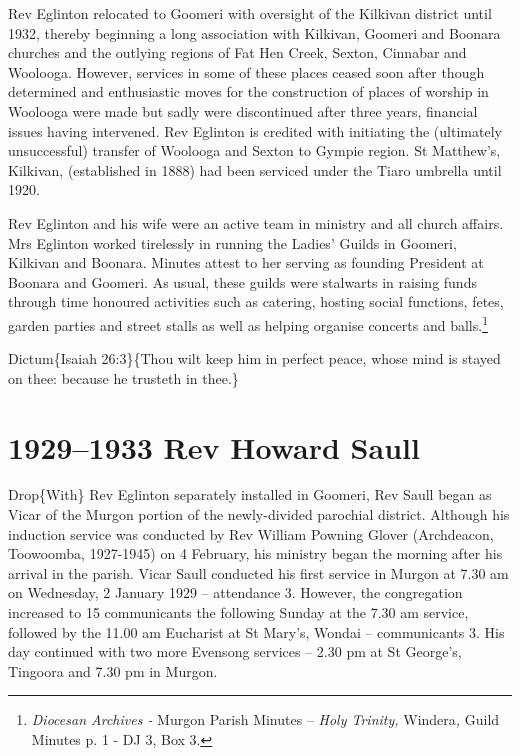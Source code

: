 Rev Eglinton relocated to Goomeri with oversight of the Kilkivan district until 1932, thereby beginning a long association with Kilkivan, Goomeri and Boonara churches and the outlying regions of Fat Hen Creek, Sexton, Cinnabar and Woolooga. However, services in some of these places ceased soon after though determined and enthusiastic moves for the construction of places of worship in Woolooga were made but sadly were discontinued after three years, financial issues having intervened. Rev Eglinton is credited with initiating the (ultimately unsuccessful) transfer of Woolooga and Sexton to Gympie region. St Matthew's, Kilkivan, (established in 1888) had been serviced under the Tiaro umbrella until 1920.

Rev Eglinton and his wife were an active team in ministry and all church affairs. Mrs Eglinton worked tirelessly in running the Ladies' Guilds in Goomeri, Kilkivan and Boonara. Minutes attest to her serving as founding President at Boonara and Goomeri. As usual, these guilds were stalwarts in raising funds through time honoured activities such as catering, hosting social functions, fetes, garden parties and street stalls as well as helping organise concerts and balls.\footnote{\emph{Diocesan Archives -} Murgon Parish Minutes -- \emph{Holy Trinity,} Windera\emph{,} Guild Minutes p. 1 - DJ 3, Box 3.}

Dictum\{Isaiah 26:3\}\{Thou wilt keep him in perfect peace, whose mind is stayed on thee: because he trusteth in thee.\}

\hypertarget{rev-howard-saull}{%
\chapter{1929--1933 Rev Howard Saull}\label{rev-howard-saull}}

Drop\{With\} Rev Eglinton separately installed in Goomeri, Rev Saull began as Vicar of the Murgon portion of the newly-divided parochial district. Although his induction service was conducted by Rev William Powning Glover (Archdeacon, Toowoomba, 1927-1945) on 4 February, his ministry began the morning after his arrival in the parish. Vicar Saull conducted his first service in Murgon at 7.30 am on Wednesday, 2 January 1929 -- attendance 3. However, the congregation increased to 15 communicants the following Sunday at the 7.30 am service, followed by the 11.00 am Eucharist at St Mary's, Wondai -- communicants 3. His day continued with two more Evensong services -- 2.30 pm at St George's, Tingoora and 7.30 pm in Murgon.

